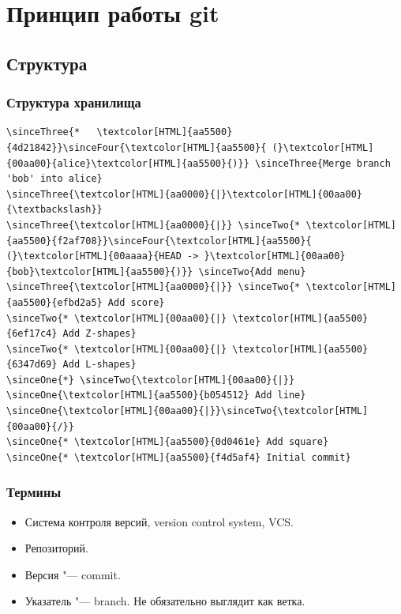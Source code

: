\documentclass[pdf,russian,aspectratio=169]{beamer}
\begin{document}
\section{Принцип работы git}

\subsection{Структура}

\begin{frame}[fragile]
    \frametitle{Структура хранилища}
    

    \newcommand{\sinceOne}[1]{\onslide<2->{#1}}
    \newcommand{\sinceTwo}[1]{\onslide<4->{#1}}
    \newcommand{\sinceThree}[1]{\onslide<6->{#1}}
    \newcommand{\sinceFour}[1]{\onslide<8->{#1}}

    \begin{block}{}
        \begin{Verbatim}[commandchars=\\\{\}]
\sinceThree{*   \textcolor[HTML]{aa5500}{4d21842}}\sinceFour{\textcolor[HTML]{aa5500}{ (}\textcolor[HTML]{00aa00}{alice}\textcolor[HTML]{aa5500}{)}} \sinceThree{Merge branch 'bob' into alice}
\sinceThree{\textcolor[HTML]{aa0000}{|}\textcolor[HTML]{00aa00}{\textbackslash}}
\sinceThree{\textcolor[HTML]{aa0000}{|}} \sinceTwo{* \textcolor[HTML]{aa5500}{f2af708}}\sinceFour{\textcolor[HTML]{aa5500}{ (}\textcolor[HTML]{00aaaa}{HEAD -> }\textcolor[HTML]{00aa00}{bob}\textcolor[HTML]{aa5500}{)}} \sinceTwo{Add menu}
\sinceThree{\textcolor[HTML]{aa0000}{|}} \sinceTwo{* \textcolor[HTML]{aa5500}{efbd2a5} Add score}
\sinceTwo{* \textcolor[HTML]{00aa00}{|} \textcolor[HTML]{aa5500}{6ef17c4} Add Z-shapes}
\sinceTwo{* \textcolor[HTML]{00aa00}{|} \textcolor[HTML]{aa5500}{6347d69} Add L-shapes}
\sinceOne{*} \sinceTwo{\textcolor[HTML]{00aa00}{|}} \sinceOne{\textcolor[HTML]{aa5500}{b054512} Add line}
\sinceOne{\textcolor[HTML]{00aa00}{|}}\sinceTwo{\textcolor[HTML]{00aa00}{/}}
\sinceOne{* \textcolor[HTML]{aa5500}{0d0461e} Add square}
\sinceOne{* \textcolor[HTML]{aa5500}{f4d5af4} Initial commit}
        \end{Verbatim}
    \end{block}
\end{frame}

\begin{frame}
    \frametitle{Термины}
    \begin{itemize}
        \pause
        \item Система контроля версий, version control system, VCS.
        \pause
        \item Репозиторий.
        \pause
        \item Версия "--- commit.
        \pause
        \item Указатель "--- branch. \pause Не обязательно выглядит как ветка.
    \end{itemize}
\end{frame}
\end{document}
